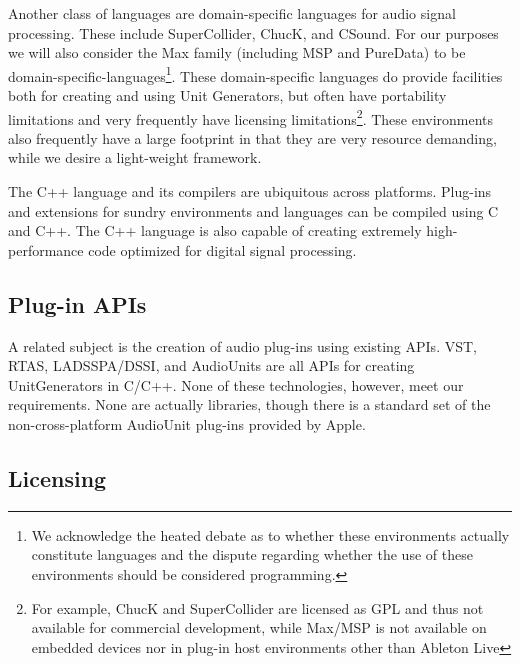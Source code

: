 \documentclass[twoside,10pt]{article}
\begin{document}
Another class of languages are domain-specific languages for audio signal processing.  These include SuperCollider\cite{McCartney:1996}, ChucK\cite{wang:2008}, and CSound.  For our purposes we will also consider the Max family (including MSP\cite{Zicarelli:1998} and PureData\cite{Puckette:1996}) to be domain-specific-languages\footnote{We acknowledge the heated debate as to whether these environments actually constitute languages and the dispute regarding whether the use of these environments should be considered programming.}.  These domain-specific languages do provide facilities both for creating and using Unit Generators, but often have portability limitations and very frequently have licensing limitations\footnote{For example, ChucK and SuperCollider are licensed as GPL and thus not available for commercial development, while Max/MSP is not available on embedded devices nor in plug-in host environments other than Ableton Live}.  These environments also frequently have a large footprint in that they are very resource demanding, while we desire a light-weight framework.

The C++ language and its compilers are ubiquitous across platforms.  Plug-ins and extensions for sundry environments and languages can be compiled using C and C++.  The C++ language is also capable of creating extremely high-performance code optimized for digital signal processing.



\subsection{Plug-in APIs} %

A related subject is the creation of audio plug-ins using existing APIs.  VST, RTAS, LADSSPA/DSSI, and AudioUnits are all APIs for creating UnitGenerators in C/C++.  None of these technologies, however, meet our requirements.  None are actually libraries, though there is a standard set of the non-cross-platform AudioUnit plug-ins provided by Apple.



\subsection{Licensing} %
\end{document}
